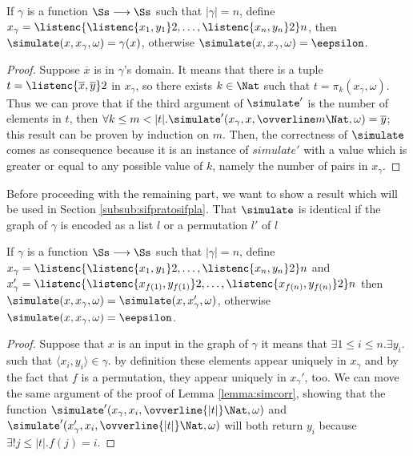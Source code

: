 \begin{conditional}{\notappendix}
    \begin{lemma}
      \label{lemma:simcorr}
      If $\gamma$ is a function $\Ss \longrightarrow \Ss$ such that $|\gamma|=n$,
       define $x_\gamma = \listenc {\listenc {x_1, y_1} 2, \ldots,
      \listenc {x_n, y_n} 2} n$,  then
      $\simulate(x, x_\gamma, \omega)=\gamma(x)$,
      otherwise $\simulate(x, x_\gamma, \omega)=\eepsilon$.
    \end{lemma}
    \begin{proof}
      Suppose $\overline x$ is in $\gamma$'s domain. It means that there is a tuple
      $t=\listenc{ \overline x, \overline y} 2$ in $x_\gamma$, so there exists
      $k \in \Nat$ such that $t=\pi_k(x_\gamma, \omega)$.
      Thus we can prove that if the third argument of $\simulate'$
      is the number of elements in $t$, then
      $\forall k\le m < |t|. \simulate'(x_\gamma, x,
      \ovverline m \Nat, \omega)=\overline y$; this result can be proven by induction
      on $m$.
      Then, the correctness of $\simulate$ comes as consequence because it is
      an instance of $simulate'$ with a value which is greater or equal to any
      possible value of $k$, namely the number of pairs in $x_\gamma$.
    \end{proof}

    Before proceeding with the remaining part, we want to show a result which will
    be used in Section \ref{subsub:sifpratosifpla}. That $\simulate$ is identical
    if the graph of $\gamma$ is encoded as a list $l$ or a permutation $l'$ of $l$

    \begin{cor}
      \label{cor:simperminvariance}
      If $\gamma$ is a function $\Ss \longrightarrow \Ss$ such that $|\gamma|=n$,
       define $x_\gamma = \listenc {\listenc {x_1, y_1} 2, \ldots,
      \listenc {x_n, y_n} 2} n$ and
      $x_\gamma' = \listenc {\listenc {x_{f(1)}, y_{f(1)}} 2, \ldots,
     \listenc {x_{f(n)}, y_{f(n)}} 2} n$ then
      $\simulate(x, x_\gamma, \omega)=\simulate(x, x_\gamma', \omega)$,
      otherwise $\simulate(x, x_\gamma, \omega)=\eepsilon$.
    \end{cor}
    \begin{proof}
      Suppose that $x$ is an input in the graph of $\gamma$ it means that
      $\exists 1 \le i\le n.\exists y_i.$ such that $\langle x_i, y_i\rangle \in \gamma$.
      by definition these elements appear uniquely in $x_\gamma$ and by the
      fact that $f$ is a permutation, they appear uniquely in $x_\gamma'$, too.
      We can move the same argument of the proof of Lemma \ref{lemma:simcorr},
      showing that the function $\simulate'(x_\gamma, x_i, \ovverline{|t|}\Nat, \omega)$
      and $\simulate'(x_\gamma', x_i, \ovverline{|t|}\Nat, \omega)$
      will both return $y_i$ because $\exists ! j\le |t|. f(j)=i$.
    \end{proof}



\end{conditional}
